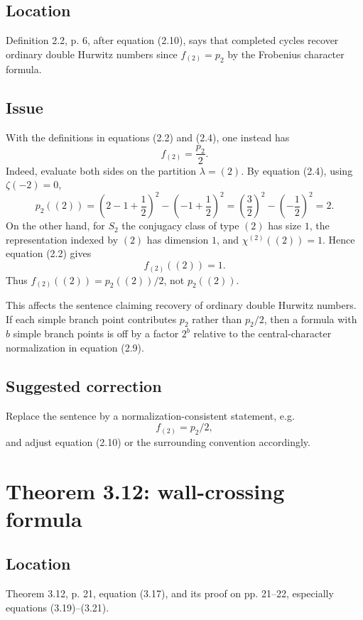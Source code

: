 \documentclass[11pt]{article}
\begin{document}
\subsection*{Location}
Definition 2.2, p. 6, after equation (2.10), says that completed cycles recover ordinary double Hurwitz numbers since $f_{(2)}=p_2$ by the Frobenius character formula.

\subsection*{Issue}
With the definitions in equations (2.2) and (2.4), one instead has
\begin{equation}\label{eq:f2-p2-half}
   f_{(2)}=\frac{p_2}{2}.
\end{equation}
Indeed, evaluate both sides on the partition $\lambda=(2)$.  By equation (2.4), using $\zeta(-2)=0$,
\[
   p_2((2))
   =\left(2-1+\frac12\right)^2-\left(-1+\frac12\right)^2
   =\left(\frac32\right)^2-\left(-\frac12\right)^2
   =2.
\]
On the other hand, for $S_2$ the conjugacy class of type $(2)$ has size $1$, the representation indexed by $(2)$ has dimension $1$, and $\chi^{(2)}((2))=1$.  Hence equation (2.2) gives
\[
   f_{(2)}((2))=1.
\]
Thus $f_{(2)}((2))=p_2((2))/2$, not $p_2((2))$.

This affects the sentence claiming recovery of ordinary double Hurwitz numbers.  If each simple branch point contributes $p_2$ rather than $p_2/2$, then a formula with $b$ simple branch points is off by a factor $2^b$ relative to the central-character normalization in equation (2.9).

\subsection*{Suggested correction}
Replace the sentence by a normalization-consistent statement, e.g.
\[
   f_{(2)}=p_2/2,
\]
and adjust equation (2.10) or the surrounding convention accordingly.

\section{Theorem 3.12: wall-crossing formula}

\subsection*{Location}
Theorem 3.12, p. 21, equation (3.17), and its proof on pp. 21--22, especially equations (3.19)--(3.21).
\end{document}
